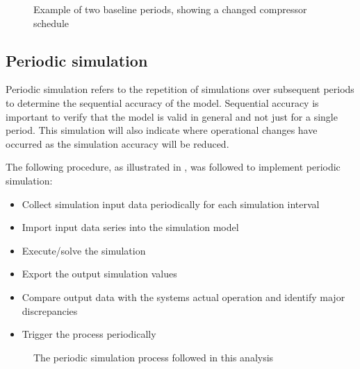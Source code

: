 		\begin{figure}[h]
			\centering
			\fbox{}
			\caption{Example of two baseline periods, showing a changed compressor schedule}
			\label{fig: Compressor schedule}
		\end{figure}
	\subsection{Periodic simulation}	
		Periodic simulation refers to the repetition of simulations over subsequent periods to determine the sequential accuracy of the model. Sequential accuracy is important to verify that the model is valid in general and not just for a single period. This simulation will also indicate where operational changes have occurred as the simulation accuracy will be reduced.
		\par 
		\clearpage
		The following procedure, as illustrated in , was followed to implement periodic simulation: 
		\begin{itemize}
			\item Collect simulation input data periodically for each simulation interval
			\item Import input data series into the simulation model
			\item Execute/solve the simulation
			\item Export the output simulation values
			\item Compare output data with the systems actual operation and identify major discrepancies
			\item Trigger the process periodically
		\end{itemize}
		\begin{figure}[h]
			\centering
			\caption{The periodic simulation process followed in this analysis}
			\label{fig: PeriodicProcess}
		\end{figure}
	
